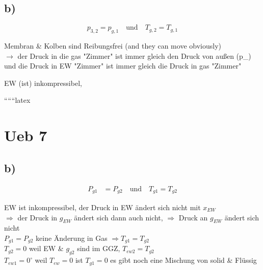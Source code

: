 

\subsection*{b)}

\[
p_{3,2} = p_{g,1} \quad \text{und} \quad T_{g,2} = T_{g,1}
\]

Membran \& Kolben sind Reibungsfrei (and they can move obviously) \\
$\rightarrow$ der Druck in die gas "Zimmer" ist immer gleich den Druck von außen (p_{}) und die Druck in EW "Zimmer" ist immer gleich die Druck in gas "Zimmer"

EW (ist) inkompressibel,

``````latex


\section*{Ueb 7}



\subsection*{b)}
\begin{align*}
P_{g1} &= P_{g2} \quad \text{und} \quad T_{g1} = T_{g2}
\end{align*}

EW ist inkompressibel, der Druck in EW ändert sich nicht mit $x_{EW}$ \\
$\Rightarrow$ der Druck in $g_{EW}$ ändert sich dann auch nicht, $\Rightarrow$ Druck an $g_{EW}$ ändert sich nicht \\
$P_{g1} = P_{g2}$ \quad keine Änderung in Gas $\Rightarrow T_{g1} = T_{g2}$ \\
$T_{g2} = 0$ \quad weil EW \& $g_{g2}$ sind im GGZ, $T_{ew2} = T_{g2}$ \\
$T_{ew1} = 0^\circ$ \quad weil $T_{ew} = 0$ \quad ist $T_{g1} = 0$ \quad es gibt noch eine Mischung von solid \& Flüssig